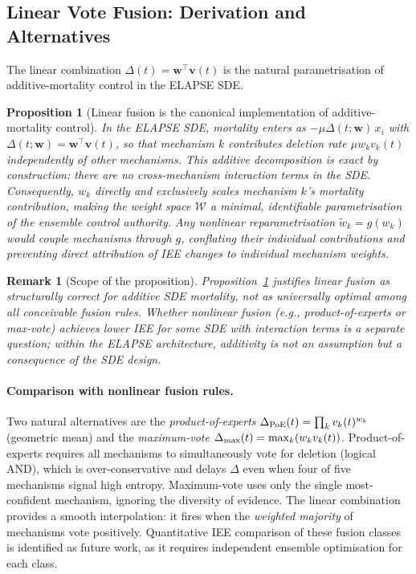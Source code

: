 \documentclass[review,12pt]{elsarticle}
\newcommand{\bfw}{\mathbf{w}}
\newcommand{\bfv}{\mathbf{v}}
\newtheorem{proposition}{Proposition}
\newtheorem{remark}{Remark}
\begin{document}


\subsection{Linear Vote Fusion: Derivation and Alternatives}
\label{sec:fusion_justification}

The linear combination $\Delta(t) = \bfw^\top\bfv(t)$ is the natural
parametrisation of additive-mortality control in the ELAPSE SDE.

\begin{proposition}[Linear fusion is the canonical implementation of additive-mortality control]
\label{prop:fusion}
In the ELAPSE SDE, mortality enters as $-\mu\Delta(t;\bfw)\,x_i$ with
$\Delta(t;\bfw) = \bfw^\top\bfv(t)$, so that mechanism $k$ contributes
deletion rate $\mu w_k v_k(t)$ independently of other mechanisms.
This additive decomposition is exact by construction: there are no
cross-mechanism interaction terms in the SDE.  Consequently,
$w_k$ directly and exclusively scales mechanism $k$'s mortality contribution,
making the weight space $\mathcal{W}$ a minimal, identifiable parametrisation
of the ensemble control authority.  Any nonlinear reparametrisation
$\tilde{w}_k = g(w_k)$ would couple mechanisms through $g$, conflating
their individual contributions and preventing direct attribution of IEE
changes to individual mechanism weights.
\end{proposition}

\begin{remark}[Scope of the proposition]
Proposition~\ref{prop:fusion} justifies linear fusion as \emph{structurally
correct} for additive SDE mortality, not as universally optimal among all
conceivable fusion rules.  Whether nonlinear fusion (e.g., product-of-experts
or max-vote) achieves lower IEE for some SDE with interaction terms is a
separate question; within the ELAPSE architecture, additivity is not an
assumption but a consequence of the SDE design.
\end{remark}

\paragraph{Comparison with nonlinear fusion rules.}
Two natural alternatives are the \emph{product-of-experts}
$\Delta_{\rm PoE}(t) = \prod_k v_k(t)^{w_k}$
(geometric mean) and the \emph{maximum-vote}
$\Delta_{\rm max}(t) = \max_k (w_k v_k(t))$.
Product-of-experts requires all mechanisms to simultaneously vote for deletion
(logical AND), which is over-conservative and delays $\Delta$ even when four
of five mechanisms signal high entropy.  Maximum-vote uses only the single
most-confident mechanism, ignoring the diversity of evidence.  The linear
combination provides a smooth interpolation: it fires when the
\emph{weighted majority} of mechanisms vote positively.
Quantitative IEE comparison of these fusion classes is identified as future work,
as it requires independent ensemble optimisation for each class.
\end{document}
